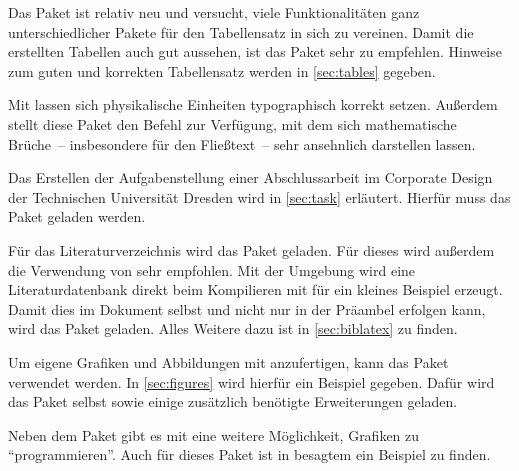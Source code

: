 \documentclass[%
  english,ngerman,%
  geometry=no,DIV=12,automark,%
]{tudscrartcl}
\begin{document}
%
\begin{Excerpt*}
\usepackage{fixltx2e}
\end{Excerpt*}
%
Das Paket  ist relativ neu und versucht, viele Funktionalitäten 
ganz unterschiedlicher Pakete für den Tabellensatz in sich zu vereinen. Damit 
die erstellten Tabellen auch gut aussehen, ist das Paket  
sehr zu empfehlen. Hinweise zum guten und korrekten Tabellensatz werden in 
\autoref{sec:tables} gegeben.
%
\begin{Excerpt*}
\usepackage{tabu}
\usepackage{booktabs}
\end{Excerpt*}
%
Mit  lassen sich physikalische Einheiten typographisch korrekt 
setzen. Außerdem stellt diese Paket den Befehl  zur Verfügung, 
mit dem sich mathematische Brüche~-- insbesondere für den Fließtext~-- sehr 
ansehnlich darstellen lassen.
%
\begin{Excerpt*}
\usepackage{units}
\end{Excerpt*}
%
Das Erstellen der Aufgabenstellung einer Abschlussarbeit im Corporate Design 
der Technischen Universität Dresden wird in \autoref{sec:task} erläutert. 
Hierfür muss das Paket  geladen werden.
%
\begin{Excerpt*}
\usepackage{tudscrsupervisor}
\end{Excerpt*}
%
Für das Literaturverzeichnis wird das Paket  geladen. Für 
dieses wird außerdem die Verwendung von  sehr empfohlen. Mit 
der Umgebung  wird eine Literaturdatenbank 
 direkt beim Kompilieren mit  für ein 
kleines Beispiel erzeugt. Damit dies im Dokument selbst und nicht nur in der 
Präambel erfolgen kann, wird das Paket  geladen. Alles 
Weitere dazu ist in \autoref{sec:biblatex} zu finden.
%
\begin{Excerpt*}
\usepackage{csquotes}
\usepackage[backend=biber,style=alphabetic]{biblatex}
\usepackage{filecontents}

\end{Excerpt*}
%
Um eigene Grafiken und Abbildungen mit  anzufertigen, kann das 
Paket  verwendet werden. In \autoref{sec:figures} wird hierfür 
ein Beispiel gegeben. Dafür wird das Paket selbst sowie einige zusätzlich 
benötigte Erweiterungen geladen.
\begin{Excerpt*}
\usepackage{tikz}
\usetikzlibrary{chains}
\usetikzlibrary{decorations.markings}
\tikzset{on grid}
\end{Excerpt*}
%
Neben dem Paket  gibt es mit  eine weitere 
Möglichkeit, Grafiken zu \enquote{programmieren}. Auch für dieses Paket ist in 
besagtem  ein Beispiel zu finden.
\end{document}

